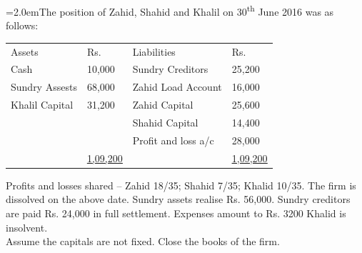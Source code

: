 \documentclass[11pt,a4paper]{article}
\newcommand{\lqn}[2]{\Needspace{6\baselineskip}\par\medskip\noindent\hangindent=2.0em\hangafter=1\makebox[2.0em][l]{\textbf{#1.}}#2\par}
\begin{document}
\lqn{116}{The position of Zahid, Shahid and Khalil on 30\textsuperscript{th}  June 2016 was as follows:\par
\par\smallskip\noindent\hspace*{1.2em}\begin{tabular}{llll}
Assets & Rs. & Liabilities & Rs. \\
Cash & 10,000 & Sundry Creditors & 25,200 \\
Sundry Assests & 68,000 & Zahid Load Account & 16,000 \\
Khalil Capital & 31,200 & Zahid Capital & 25,600 \\
 &  & Shahid Capital & 14,400 \\
 &  & Profit and loss a/c & 28,000 \\
 & \underline{\underline{1,09,200}} &  & \underline{\underline{1,09,200}} \\
\end{tabular}\par\smallskip
Profits and losses shared – Zahid 18/35; Shahid 7/35; Khalid 10/35. The firm is dissolved on the above date. Sundry assets realise Rs. 56,000. Sundry creditors are paid Rs. 24,000 in full settlement. Expenses amount to Rs. 3200 Khalid is insolvent.\\
Assume the capitals are not fixed. Close the books of the firm.\par
}
\end{document}
